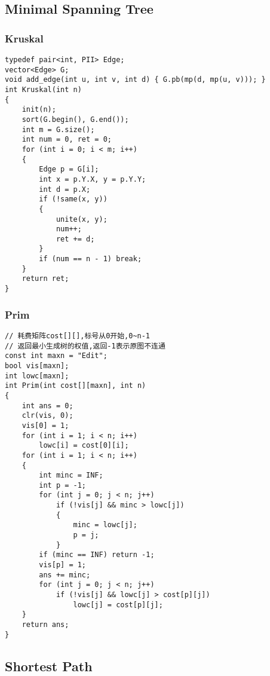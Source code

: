 \documentclass[twoside]{article}
\begin{document}
\subsection{Minimal Spanning Tree}
\subsubsection{Kruskal}
\begin{lstlisting}
typedef pair<int, PII> Edge;
vector<Edge> G;
void add_edge(int u, int v, int d) { G.pb(mp(d, mp(u, v))); }
int Kruskal(int n)
{
    init(n);
    sort(G.begin(), G.end());
    int m = G.size();
    int num = 0, ret = 0;
    for (int i = 0; i < m; i++)
    {
        Edge p = G[i];
        int x = p.Y.X, y = p.Y.Y;
        int d = p.X;
        if (!same(x, y))
        {
            unite(x, y);
            num++;
            ret += d;
        }
        if (num == n - 1) break;
    }
    return ret;
}
\end{lstlisting}
\subsubsection{Prim}
\begin{lstlisting}
// 耗费矩阵cost[][],标号从0开始,0~n-1
// 返回最小生成树的权值,返回-1表示原图不连通
const int maxn = "Edit";
bool vis[maxn];
int lowc[maxn];
int Prim(int cost[][maxn], int n)
{
    int ans = 0;
    clr(vis, 0);
    vis[0] = 1;
    for (int i = 1; i < n; i++)
        lowc[i] = cost[0][i];
    for (int i = 1; i < n; i++)
    {
        int minc = INF;
        int p = -1;
        for (int j = 0; j < n; j++)
            if (!vis[j] && minc > lowc[j])
            {
                minc = lowc[j];
                p = j;
            }
        if (minc == INF) return -1;
        vis[p] = 1;
        ans += minc;
        for (int j = 0; j < n; j++)
            if (!vis[j] && lowc[j] > cost[p][j])
                lowc[j] = cost[p][j];
    }
    return ans;
}
\end{lstlisting}
\subsection{Shortest Path}
\end{document}
